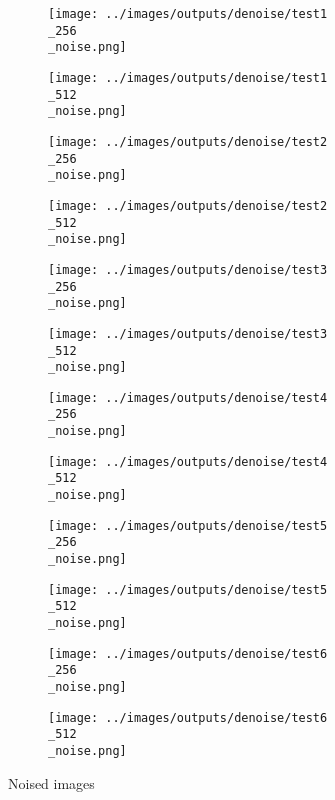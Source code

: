\begin{figure}[!ht]
   \centering
\begin{subfigure}[t]{0.15\textwidth}
    \texttt{[image: ../images/outputs/denoise/test1\\\_256\\\_noise.png]}
    \caption{}
    \centering
  \end{subfigure}
\begin{subfigure}[t]{0.15\textwidth}
    \texttt{[image: ../images/outputs/denoise/test1\\\_512\\\_noise.png]}
    \caption{}
    \centering
  \end{subfigure}
\begin{subfigure}[t]{0.15\textwidth}
    \texttt{[image: ../images/outputs/denoise/test2\\\_256\\\_noise.png]}
    \caption{}
    \centering
  \end{subfigure}
\begin{subfigure}[t]{0.15\textwidth}
    \texttt{[image: ../images/outputs/denoise/test2\\\_512\\\_noise.png]}
    \caption{}
    \centering
  \end{subfigure}
\begin{subfigure}[t]{0.15\textwidth}
    \texttt{[image: ../images/outputs/denoise/test3\\\_256\\\_noise.png]}
    \caption{}
    \centering
  \end{subfigure}
\begin{subfigure}[t]{0.15\textwidth}
    \texttt{[image: ../images/outputs/denoise/test3\\\_512\\\_noise.png]}
    \caption{}
    \centering
  \end{subfigure}
\begin{subfigure}[t]{0.15\textwidth}
    \texttt{[image: ../images/outputs/denoise/test4\\\_256\\\_noise.png]}
    \caption{}
    \centering
  \end{subfigure}
\begin{subfigure}[t]{0.15\textwidth}
    \texttt{[image: ../images/outputs/denoise/test4\\\_512\\\_noise.png]}
    \caption{}
    \centering
  \end{subfigure}
\begin{subfigure}[t]{0.15\textwidth}
    \texttt{[image: ../images/outputs/denoise/test5\\\_256\\\_noise.png]}
    \caption{}
    \centering
  \end{subfigure}
\begin{subfigure}[t]{0.15\textwidth}
    \texttt{[image: ../images/outputs/denoise/test5\\\_512\\\_noise.png]}
    \caption{}
    \centering
  \end{subfigure}
\begin{subfigure}[t]{0.15\textwidth}
    \texttt{[image: ../images/outputs/denoise/test6\\\_256\\\_noise.png]}
    \caption{}
    \centering
  \end{subfigure}
\begin{subfigure}[t]{0.15\textwidth}
    \texttt{[image: ../images/outputs/denoise/test6\\\_512\\\_noise.png]}
    \caption{}
    \centering
  \end{subfigure}
 \caption{Noised images}
 \end{figure}

